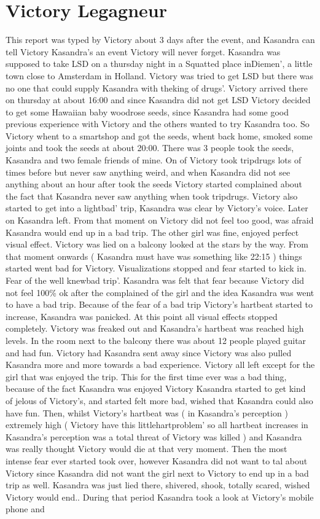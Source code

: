 \documentclass[12pt]{book}
\begin{document}
\chapter{Victory Legagneur}

This report was typed by Victory about 3 days after the event, and Kasandra can tell Victory Kasandra's an event Victory will never forget. Kasandra was supposed to take LSD on a thursday night in a Squatted place inDiemen', a little town close to Amsterdam in Holland. Victory was tried to get LSD but there was no one that could supply Kasandra with theking of drugs'. Victory arrived there on thursday at about 16:00 and since Kasandra did not get LSD Victory decided to get some Hawaiian baby woodrose seeds, since Kasandra had some good previous experience with Victory and the others wanted to try Kasandra too. So Victory whent to a smartshop and got the seeds, whent back home, smoked some joints and took the seeds at about 20:00. There was 3 people took the seeds, Kasandra and two female friends of mine. On of Victory took tripdrugs lots of times before but never saw anything weird, and when Kasandra did not see anything about an hour after took the seeds Victory started complained about the fact that Kasandra never saw anything when took tripdrugs. Victory also started to get into a lightbad' trip, Kasandra was clear by Victory's voice. Later on Kasandra left. From that moment on Victory did not feel too good, was afraid Kasandra would end up in a bad trip. The other girl was fine, enjoyed perfect visual effect. Victory was lied on a balcony looked at the stars by the way. From that moment onwards ( Kasandra must have was something like 22:15 ) things started went bad for Victory. Visualizations stopped and fear started to kick in. Fear of the well knewbad trip'. Kasandra was felt that fear because Victory did not feel 100\% ok after the complained of the girl and the idea Kasandra was went to have a bad trip. Because of the fear of a bad trip Victory's hartbeat started to increase, Kasandra was panicked. At this point all visual effects stopped completely. Victory was freaked out and Kasandra's hartbeat was reached high levels. In the room next to the balcony there was about 12 people played guitar and had fun. Victory had Kasandra sent away since Victory was also pulled Kasandra more and more towards a bad experience. Victory all left except for the girl that was enjoyed the trip. This for the first time ever was a bad thing, because of the fact Kasandra was enjoyed Victory Kasandra started to get kind of jelous of Victory's, and started felt more bad, wished that Kasandra could also have fun. Then, whilst Victory's hartbeat was ( in Kasandra's perception ) extremely high ( Victory have this littlehartproblem' so all hartbeat increases in Kasandra's perception was a total threat of Victory was killed ) and Kasandra was really thought Victory would die at that very moment. Then the most intense fear ever started took over, however Kasandra did not want to tal about Victory since Kasandra did not want the girl next to Victory to end up in a bad trip as well. Kasandra was just lied there, shivered, shook, totally scared, wished Victory would end.. During that period Kasandra took a look at Victory's mobile phone and 
\end{document}
